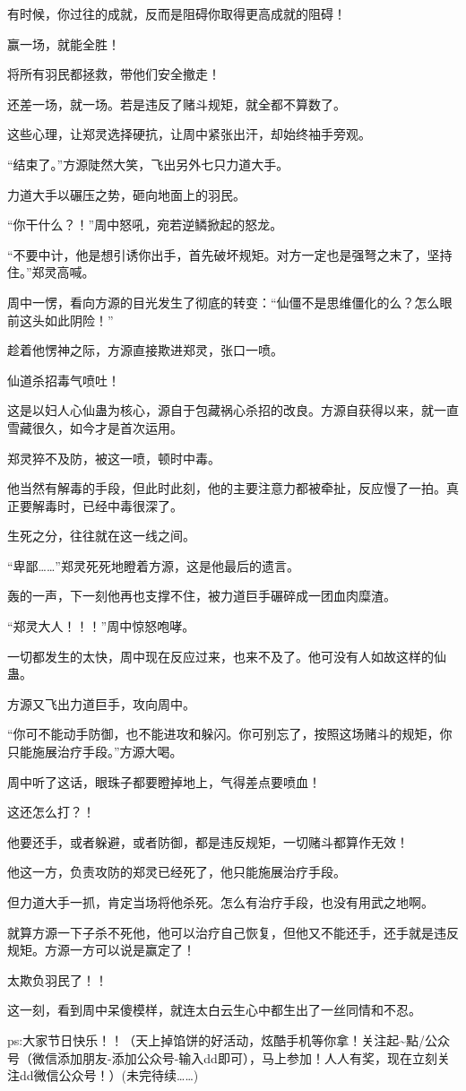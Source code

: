 \begin{this_body}
有时候，你过往的成就，反而是阻碍你取得更高成就的阻碍！

赢一场，就能全胜！

将所有羽民都拯救，带他们安全撤走！

还差一场，就一场。若是违反了赌斗规矩，就全都不算数了。

这些心理，让郑灵选择硬抗，让周中紧张出汗，却始终袖手旁观。

“结束了。”方源陡然大笑，飞出另外七只力道大手。

力道大手以碾压之势，砸向地面上的羽民。

“你干什么？！”周中怒吼，宛若逆鳞掀起的怒龙。

“不要中计，他是想引诱你出手，首先破坏规矩。对方一定也是强弩之末了，坚持住。”郑灵高喊。

周中一愣，看向方源的目光发生了彻底的转变：“仙僵不是思维僵化的么？怎么眼前这头如此阴险！”

趁着他愣神之际，方源直接欺进郑灵，张口一喷。

仙道杀招毒气喷吐！

这是以妇人心仙蛊为核心，源自于包藏祸心杀招的改良。方源自获得以来，就一直雪藏很久，如今才是首次运用。

郑灵猝不及防，被这一喷，顿时中毒。

他当然有解毒的手段，但此时此刻，他的主要注意力都被牵扯，反应慢了一拍。真正要解毒时，已经中毒很深了。

生死之分，往往就在这一线之间。

“卑鄙……”郑灵死死地瞪着方源，这是他最后的遗言。

轰的一声，下一刻他再也支撑不住，被力道巨手碾碎成一团血肉糜渣。

“郑灵大人！！！”周中惊怒咆哮。

一切都发生的太快，周中现在反应过来，也来不及了。他可没有人如故这样的仙蛊。

方源又飞出力道巨手，攻向周中。

“你可不能动手防御，也不能进攻和躲闪。你可别忘了，按照这场赌斗的规矩，你只能施展治疗手段。”方源大喝。

周中听了这话，眼珠子都要瞪掉地上，气得差点要喷血！

这还怎么打？！

他要还手，或者躲避，或者防御，都是违反规矩，一切赌斗都算作无效！

他这一方，负责攻防的郑灵已经死了，他只能施展治疗手段。

但力道大手一抓，肯定当场将他杀死。怎么有治疗手段，也没有用武之地啊。

就算方源一下子杀不死他，他可以治疗自己恢复，但他又不能还手，还手就是违反规矩。方源一方可以说是赢定了！

太欺负羽民了！！

这一刻，看到周中呆傻模样，就连太白云生心中都生出了一丝同情和不忍。

ps:大家节日快乐！！（天上掉馅饼的好活动，炫酷手机等你拿！关注起\~{}點/公众号（微信添加朋友-添加公众号-输入dd即可），马上参加！人人有奖，现在立刻关注dd微信公众号！）(未完待续……)

\end{this_body}

